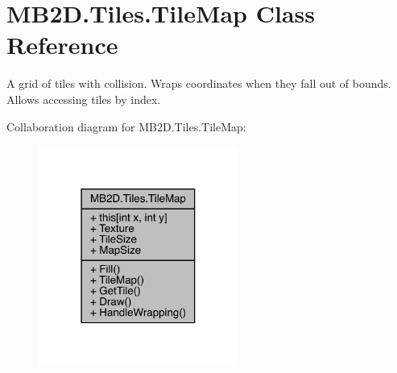 \hypertarget{class_m_b2_d_1_1_tiles_1_1_tile_map}{}\section{M\+B2\+D.\+Tiles.\+Tile\+Map Class Reference}
\label{class_m_b2_d_1_1_tiles_1_1_tile_map}


A grid of tiles with collision. Wraps coordinates when they fall out of bounds. Allows accessing tiles by index.  




Collaboration diagram for M\+B2\+D.\+Tiles.\+Tile\+Map\+:
\nopagebreak
\begin{figure}[H]
\begin{center}
\leavevmode
\includegraphics[width=186pt]{class_m_b2_d_1_1_tiles_1_1_tile_map__coll__graph}
\end{center}
\end{figure}
